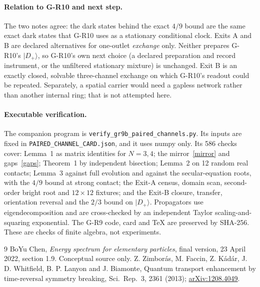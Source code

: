 \documentclass[11pt,a4paper]{article}
\newcommand{\ket}[1]{|#1\rangle}
\begin{document}
\paragraph{Relation to G-R10 and next step.}
The two notes agree: the dark states behind the exact $4/9$ bound are the
same exact dark states that G-R10 uses as a stationary conditional clock.
Exits A and B are declared alternatives for one-outlet \emph{exchange}
only. Neither prepares G-R10's $\ket{D_+}$, so G-R10's own next choice
(a declared preparation and record instrument, or the unfiltered
stationary mixture) is unchanged. Exit B is an exactly closed, solvable
three-channel exchange on which G-R10's readout could be repeated.
Separately, a spatial carrier would need a gapless network rather than
another internal ring; that is not attempted here.

\paragraph{Executable verification.}
The companion program is
\texttt{verify\_gr9b\_paired\_channels.py}.
Its inputs are fixed in \texttt{PAIRED\_CHANNEL\_CARD.json}, and it uses
numpy only. Its 586 checks
cover: Lemma~1 as matrix identities for $N=3,4$; the mirror~\eqref{mirror}
and gaps~\eqref{gaps}; Theorem~1 by independent bisection; Lemma~2 on 12
random real contacts; Lemma~3 against full evolution and against the
secular-equation roots, with the $4/9$ bound at strong contact; the Exit-A
census, domain scan, second-order bright root and $12\times12$ fixtures;
and the Exit-B closure,
transfer, orientation reversal and the $2/3$ bound on $\ket{D_+}$. Propagators use eigendecomposition and
are cross-checked by an independent Taylor scaling-and-squaring
exponential. The G-R9 code, card and TeX are preserved by SHA-256. These
are checks of finite algebra, not experiments.

\begin{thebibliography}{9}
 BoYu Chen, \emph{Energy spectrum for elementary particles},
final version, 23 April 2022, section 1.9. Conceptual source only.
 Z. Zimbor\'as, M. Faccin, Z. K\'ad\'ar, J. D. Whitfield,
B. P. Lanyon and J. Biamonte, Quantum transport enhancement by
time-reversal symmetry breaking, Sci.\ Rep.\ 3, 2361 (2013);
\href{https://arxiv.org/abs/1208.4049}{arXiv:1208.4049}.
\end{thebibliography}
\end{document}
